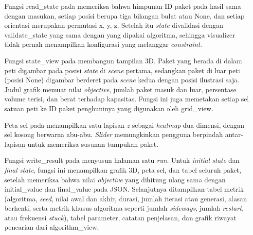 Fungsi read\_state pada  memeriksa bahwa himpunan ID paket pada hasil sama dengan masukan, setiap posisi berupa tiga bilangan bulat atau None, dan setiap orientasi merupakan permutasi x, y, z. Setelah itu \textit{state} divalidasi dengan validate\_state yang sama dengan yang dipakai algoritma, sehingga visualizer tidak pernah menampilkan konfigurasi yang melanggar \textit{constraint}.


Fungsi state\_view pada  membangun tampilan 3D. Paket yang berada di dalam peti digambar pada posisi \textit{state} di \textit{scene} pertama, sedangkan paket di luar peti (posisi None) digambar berderet pada \textit{scene} kedua dengan posisi ilustrasi saja. Judul grafik memuat nilai \textit{objective}, jumlah paket masuk dan luar, persentase volume terisi, dan berat terhadap kapasitas. Fungsi ini juga memetakan setiap sel satuan peti ke ID paket penghuninya yang digunakan oleh grid\_view.


Peta sel pada  menampilkan satu lapisan $z$ sebagai \textit{heatmap} dua dimensi, dengan sel kosong berwarna abu-abu. \textit{Slider} memungkinkan pengguna berpindah antar-lapisan untuk memeriksa susunan tumpukan paket.


Fungsi write\_result pada  menyusun halaman satu \textit{run}. Untuk \textit{initial state} dan \textit{final state}, fungsi ini menampilkan grafik 3D, peta sel, dan tabel seluruh paket, setelah memeriksa bahwa nilai \textit{objective} yang dihitung ulang sama dengan initial\_value dan final\_value pada JSON. Selanjutnya ditampilkan tabel metrik (algoritma, \textit{seed}, nilai awal dan akhir, durasi, jumlah iterasi atau generasi, alasan berhenti, serta metrik khusus algoritma seperti jumlah \textit{sideways}, jumlah \textit{restart}, atau frekuensi \textit{stuck}), tabel parameter, catatan penjelasan, dan grafik riwayat pencarian dari algorithm\_view.


